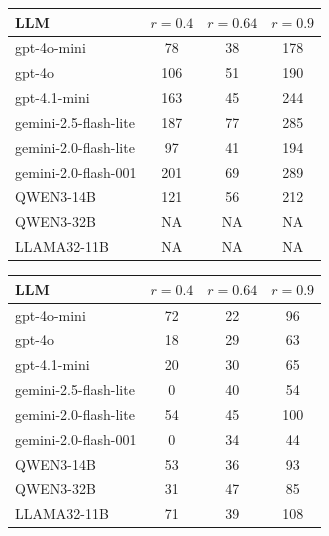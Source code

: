 \begin{table}[t]
\begin{minipage}[t]{0.485\textwidth}
\centering
{}
\begin{tabularx}{\linewidth}{@{}>{\raggedright\arraybackslash}Xccc@{}}
\toprule
LLM & $r=0.4$ & $r=0.64$ & $r=0.9$ \\
\midrule
gpt-4o-mini            &  78 & 38 & 178 \\
gpt-4o                 & 106 & 51 & 190 \\
gpt-4.1-mini           & 163 & 45 & 244 \\
gemini-2.5-flash-lite  & 187 & 77 & 285 \\
gemini-2.0-flash-lite  &  97 & 41 & 194 \\
gemini-2.0-flash-001   & 201 & 69 & 289 \\
QWEN3-14B              & 121 & 56 & 212 \\
QWEN3-32B              & NA  & NA & NA  \\
LLAMA32-11B            & NA  & NA & NA  \\
\bottomrule
\end{tabularx}
\end{minipage}
\hfill
\begin{minipage}[t]{0.485\textwidth}
\centering
{}
\begin{tabularx}{\linewidth}{@{}>{\raggedright\arraybackslash}Xccc@{}}
\toprule
LLM & $r=0.4$ & $r=0.64$ & $r=0.9$ \\
\midrule
gpt-4o-mini            & 72 & 22 &  96 \\
gpt-4o                 & 18 & 29 &  63 \\
gpt-4.1-mini           & 20 & 30 &  65 \\
gemini-2.5-flash-lite  &  0 & 40 &  54 \\
gemini-2.0-flash-lite  & 54 & 45 & 100 \\
gemini-2.0-flash-001   &  0 & 34 &  44 \\
QWEN3-14B              & 53 & 36 &  93 \\
QWEN3-32B              & 31 & 47 &  85 \\
LLAMA32-11B            & 71 & 39 & 108 \\
\bottomrule
\end{tabularx}
\end{minipage}

\end{table}